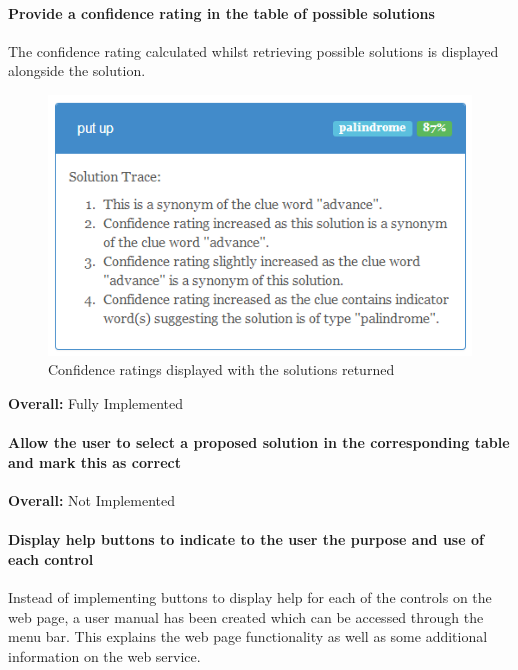 \paragraph{Provide a confidence rating in the table of possible solutions}

The confidence rating calculated whilst retrieving possible solutions is 
displayed alongside the solution.

\begin{figure}[H]
	\centering
	\includegraphics[keepaspectratio=true]{evidence/confidence.png}
	\caption{Confidence ratings displayed with the solutions returned}
\end{figure}

{\bf Overall:} Fully Implemented


\paragraph{Allow the user to select a proposed solution in the corresponding
table and mark this as correct}

{\bf Overall:} Not Implemented


\paragraph{Display help buttons to indicate to the user the purpose and use of
each control}

Instead of implementing buttons to display help for each of the controls on the
web page,  a user manual has been created which can be accessed through the menu
bar. This explains  the web page functionality as well as some additional
information on the web service.

